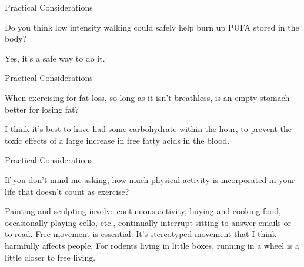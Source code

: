 \documentclass[11pt,oneside,openany,extrafontsizes]{memoir}
\begin{document}
\begin{qaexchange}{Practical Considerations}

    \begin{question}
        Do you think low intensity walking could safely help burn up PUFA stored in the body?
    \end{question}

    \begin{answer}
       Yes, it's a safe way to do it.
    \end{answer}
\end{qaexchange}

\begin{qaexchange}{Practical Considerations}

    \begin{question}
        When exercising for fat loss, so long as it isn't breathless, is an empty stomach better for losing fat?
    \end{question}

    \begin{answer}
      I think it's best to have had some carbohydrate within the hour, to prevent the toxic effects of a large increase in free fatty acids in the blood.
    \end{answer}
\end{qaexchange}

\begin{qaexchange}{Practical Considerations}

    \begin{question}
        If you don't mind me asking, how much physical activity is incorporated in your life that doesn't count as exercise?
    \end{question}

    \begin{answer}
      Painting and sculpting involve continuous activity, buying and cooking food, occasionally playing cello, etc., continually interrupt sitting to answer emails or to read. Free movement is essential. It's stereotyped movement that I think harmfully affects people. For rodents living in little boxes, running in a wheel is a little closer to free living.
    \end{answer}
\end{qaexchange}
\end{document}
